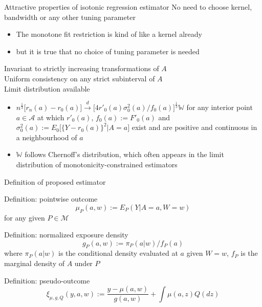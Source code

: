 \documentclass{beamer}
\newcommand{\f}[2]{\frac{#1}{#2}}
\newcommand{\vs}[1]{\vspace{#1 cm}}
\begin{document}
\begin{frame}{Attractive properties of isotonic regression estimator}
  No need to choose kernel, bandwidth or any other tuning parameter
  \begin{itemize}
    \item The monotone fit restriction is kind of like a kernel already
    \item but it is true that no choice of tuning parameter is needed
  \end{itemize}
  Invariant to strictly increasing transformations of $A$ \\
  \vs{0.1}
  Uniform consistency on any strict subinterval of $A$ \\
  \vs{0.1}
  Limit distribution available
  \begin{itemize}
    \item $n^{\f{1}{3}} \big[r_n(a) -r_0(a) \big] \stackrel{d}{\rightarrow} \big[ 4r'_0(a) \sigma_0^2(a)/f_0(a) \big]^{\f{1}{3}} \mathbb{W}$
    for any interior point $a \in \mathcal{A}$ at which $r'_0(a)$, $f_0(a) := F'_0(a)$ and $\sigma_0^2(a) := E_0 \big[ \{ Y -r_0(a) \}^2 |A=a \big]$ exist and are positive and continuous in a neighbourhood of $a$
    \item $\mathbb{W}$ follows Chernoff's distribution, which often appears in the limit distribution of monotonicity-constrained estimators
  \end{itemize}
\end{frame}

\begin{frame}{Definition of proposed estimator}
  \begin{block}{Definition: pointwise outcome}
    $$\mu_P(a,w) := E_P(Y|A=a,W=w)$$ for any given $P \in \mathcal{M}$
  \end{block}
  \begin{block}{Definition: normalized exposure density}
    $$g_P(a,w) := \pi_P(a|w)/f_P(a)$$
    where $\pi_P(a|w)$ is the conditional density evaluated at $a$ given $W=w$, $f_P$ is the marginal density of $A$ under $P$
  \end{block}
  \begin{block}{Definition: pseudo-outcome}
    $$\xi_{\mu,g,Q}(y,a,w) := \f{y-\mu(a,w)}{g(a,w)} +\int \mu(a,z) Q(dz)$$
  \end{block}
\end{frame}
\end{document}
